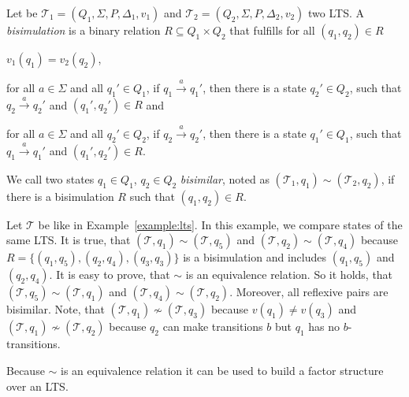 \begin{definition}
    Let be $\mathcal{T}_1 = (Q_1, \Sigma, P, \Delta_1, v_1)$ and $\mathcal{T}_2 = (Q_2, \Sigma, P, \Delta_2, v_2)
    $ two LTS. A \emph{bisimulation} is a binary relation $R \subseteq Q_1 \times Q_2$ that fulfills for all $(q_1,
    q_2) \in R$
    \begin{compactitem}
        \item $v_1 (q_1) = v_2 (q_2)$,
        \item for all $a \in \Sigma$ and all $q_1' \in Q_1$, if $q_1 \overset{a}{\rightarrow} q_1'$, then there
        is a state $q_2' \in Q_2$, such that $q_2 \overset{a}{\rightarrow} q_2'$ and $(q_1', q_2') \in R$ and
        \item for all $a \in \Sigma$ and all $q_2' \in Q_2$, if $q_2 \overset{a}{\rightarrow} q_2'$, then there is a
        state $q_1' \in Q_1$, such that $q_1 \overset{a}{\rightarrow} q_1'$ and $(q_1', q_2') \in R$.
    \end{compactitem}
    We call two states $q_1 \in Q_1$, $q_2 \in Q_2$ \emph{bisimilar}, noted as $(\mathcal{T}_1, q_1) \sim
    (\mathcal{T}_2, q_2)$, if there
    is a bisimulation $R$ such that $(q_1, q_2) \in R$.
\end{definition}

\begin{example}
    \label{example:bisimilar}
    Let $\mathcal{T}$ be like in Example~\ref{example:lts}. In this example, we compare states of the same LTS. It is
    true, that $(\mathcal{T}, q_1) \sim (\mathcal{T}, q_5)$ and $(\mathcal{T}, q_2) \sim (\mathcal{T}, q_4)$ because
    $R = \{(q_1, q_5), (q_2, q_4), (q_3, q_3)\}$ is a bisimulation and includes $(q_1, q_5)$ and $(q_2, q_4)$. It is
    easy to prove, that $\sim$ is an equivalence relation. So it holds, that $(\mathcal{T}, q_5) \sim (\mathcal{T},
    q_1)$ and $(\mathcal{T}, q_4) \sim (\mathcal{T}, q_2)$. Moreover, all reflexive pairs are bisimilar. Note, that
    $(\mathcal{T}, q_1) \not\sim (\mathcal{T}, q_3)$ because $v(q_1) \neq v(q_3)$ and $(\mathcal{T}, q_1)
    \not\sim (\mathcal{T}, q_2)$ because $q_2$ can make transitions $b$ but $q_1$ has no $b$-transitions.
\end{example}

Because $\sim$ is an equivalence relation it can be used to build a factor structure over an LTS.

